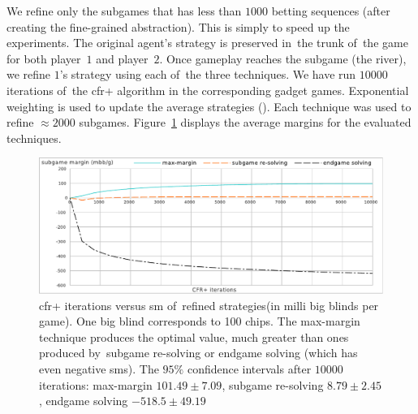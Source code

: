 We refine only the subgames that has less than $1000$ betting sequences (after creating the fine-grained abstraction).
This is simply to speed up the experiments.
The original agent's strategy is preserved in~the trunk of~the game for both player~$1$ and player~$2$.
Once gameplay reaches the subgame (the river), we refine $1$'s strategy using each of~the three techniques.
We have run $10000$ iterations of~the \acrshort{cfr}+ algorithm in the corresponding gadget games.
Exponential weighting is used to update the average strategies (\cite{Tammelin2015solving}).
Each technique was used to refine $\approx 2000$ subgames.
Figure~\ref{fig:sm-experiments} displays the average margins for the evaluated techniques.

\begin{figure}[H]
  \centering
  \includegraphics[width=\textwidth]{../img/sm-experiments}
  \def\captionTitle{\acrshort{cfr}+ iterations versus \acrshort{sm} of~refined strategies}
  \caption[\captionTitle]{\captionTitle (in milli big blinds per game).
    One big blind corresponds to 100 chips.
    The max-margin technique produces the optimal value, much greater than ones produced by~subgame re-solving or endgame solving (which has even negative \acrshort{sm}s).
    The $95\%$ confidence intervals after $10000$ iterations:
    max-margin $101.49 \pm 7.09$, subgame re-solving $8.79 \pm 2.45$, endgame solving $-518.5 \pm 49.19$
  }
  \label{fig:sm-experiments}
\end{figure}
